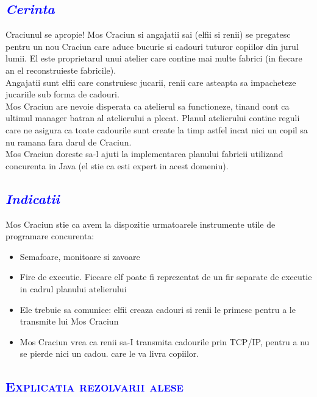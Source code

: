 \documentclass{article}
\begin{document}
\textcolor{blue}{\subsection{\itshape  \textcolor{blue}{Cerinta }}}
 \quad Craciunul se apropie! Mos Craciun si angajatii sai (elfii si renii) se pregatesc pentru un nou Craciun care aduce bucurie si cadouri tuturor copiilor din jurul lumii. El este proprietarul unui atelier care contine mai multe fabrici (in fiecare an el reconstruieste fabricile).\\
Angajatii sunt elfii care construiesc jucarii, renii care asteapta sa impacheteze jucariile sub forma de
cadouri.\\ Mos Craciun are nevoie disperata ca atelierul sa functioneze, tinand cont ca ultimul manager
batran al atelierului a plecat. Planul atelierului contine reguli care ne asigura ca toate cadourile sunt
create la timp astfel incat nici un copil sa nu ramana fara darul de Craciun.\\
Mos Craciun doreste sa-l ajuti la implementarea planului fabricii utilizand concurenta in Java (el stie ca
esti expert in acest domeniu).\par	
\vspace{3mm}

\textcolor{blue}{\subsection{\itshape \textcolor{blue}{Indicatii }}}	
Mos Craciun stie ca avem la dispozitie urmatoarele instrumente utile de
programare concurenta:
\begin{itemize}
    \item Semafoare, monitoare si zavoare
    \item Fire de executie. Fiecare elf poate fi reprezentat de un fir separate de executie in cadrul planului
atelierului
    \item Ele trebuie sa comunice: elfii creaza cadouri si renii le primesc pentru a le transmite lui Mos Craciun
    \item Mos Craciun vrea ca renii sa-I transmita cadourile prin TCP/IP, pentru a nu se pierde nici un cadou.
care le va livra copiilor.
\end{itemize}

\newpage
    \begin{center}
	    \textcolor{blue}{\section{\bfseries\scshape\textcolor{blue} {Explicatia rezolvarii alese }}}
	   \vspace{10mm}
	\end{center}
	
\end{document}
